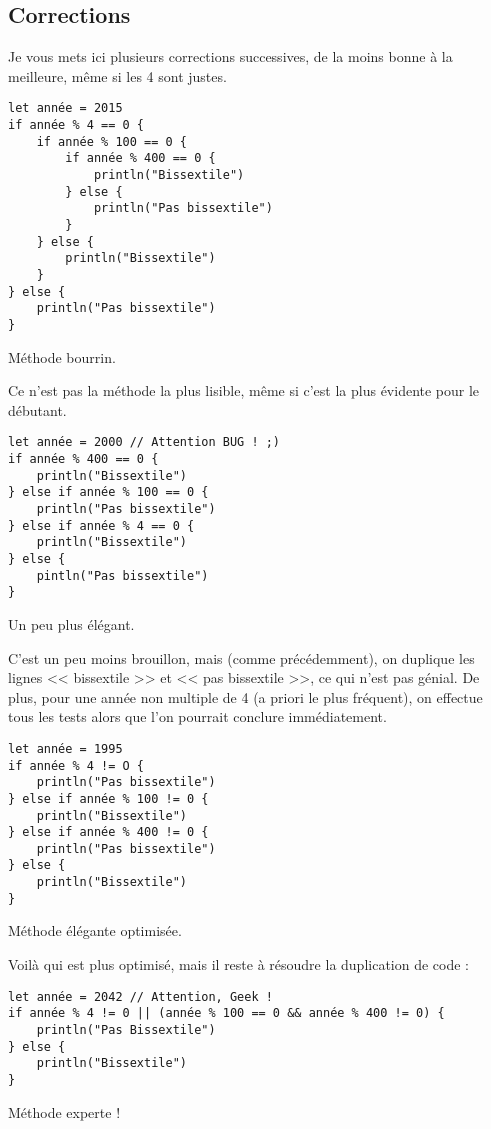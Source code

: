 \subsection{Corrections}
Je vous mets ici plusieurs corrections successives,
de la moins bonne à la meilleure, même si les 4 sont justes.

\begin{listing}[h!]
\begin{verbatim}
let année = 2015
if année % 4 == 0 {
    if année % 100 == 0 {
        if année % 400 == 0 {
            println("Bissextile")
        } else {
            println("Pas bissextile")
        }
    } else {
        println("Bissextile")
    }
} else {
    println("Pas bissextile")
}
\end{verbatim}
\caption{Méthode bourrin.}
\end{listing}
Ce n'est pas la méthode la plus lisible,
même si c'est la plus évidente pour le débutant.

\begin{listing}[h!]
\begin{verbatim}
let année = 2000 // Attention BUG ! ;)
if année % 400 == 0 {
    println("Bissextile")
} else if année % 100 == 0 {
    println("Pas bissextile")
} else if année % 4 == 0 {
    println("Bissextile")
} else {
    pintln("Pas bissextile")
}
\end{verbatim}
\caption{Un peu plus élégant.}
\end{listing}
C'est un peu moins brouillon, mais (comme précédemment), on duplique les lignes << bissextile >> et << pas bissextile >>, ce qui n'est pas génial. De plus, pour une année non multiple de 4 (a priori le plus fréquent), on effectue tous les tests alors que l'on pourrait conclure immédiatement.

\begin{listing}[h!]
\begin{verbatim}
let année = 1995
if année % 4 != O {
    println("Pas bissextile")
} else if année % 100 != 0 {
    println("Bissextile")
} else if année % 400 != 0 {
    println("Pas bissextile")
} else {
    println("Bissextile")
}
\end{verbatim}
\caption{Méthode élégante optimisée.}
\end{listing}
Voilà qui est plus optimisé, mais il reste à résoudre la duplication de code :

\begin{listing}[h!]
\begin{verbatim}
let année = 2042 // Attention, Geek !
if année % 4 != 0 || (année % 100 == 0 && année % 400 != 0) {
    println("Pas Bissextile")
} else {
    println("Bissextile")
}
\end{verbatim}
\caption{Méthode experte !}
\end{listing}

